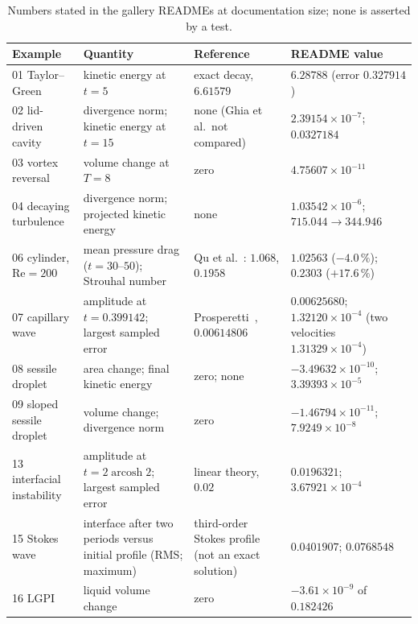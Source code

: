 \begin{table}[tbp]
  \centering\footnotesize
  \caption{Numbers stated in the gallery READMEs at documentation size; none
  is asserted by a test.}\label{tab:verif:gallery}
  \begin{tabular}{@{}>{\raggedright}p{2.2cm}>{\raggedright}p{3.4cm}>{\raggedright}p{2.5cm}>{\raggedright\arraybackslash}p{3.6cm}@{}}
    \toprule
    Example & Quantity & Reference & README value\\
    \midrule
    01 Taylor--Green & kinetic energy at $t=5$ & exact decay, $6.61579$ & $6.28788$ (error $0.327914$)\\
    02 lid-driven cavity & divergence norm; kinetic energy at $t=15$ & none (Ghia et al.\ not compared) & $2.39154\times10^{-7}$; $0.0327184$\\
    03 vortex reversal & volume change at $T=8$ & zero & $4.75607\times10^{-11}$\\
    04 decaying turbulence & divergence norm; projected kinetic energy & none & $1.03542\times10^{-6}$; $715.044\to344.946$\\
    06 cylinder, $\mathrm{Re}=200$ & mean pressure drag ($t=30$--$50$); Strouhal number & Qu et al.~\cite{qu2013}: $1.068$, $0.1958$ & $1.02563$ ($-4.0\,\%$); $0.2303$ ($+17.6\,\%$)\\
    07 capillary wave & amplitude at $t=0.399142$; largest sampled error & Prosperetti~\cite{prosperetti1981}, $0.00614806$ & $0.00625680$; $1.32120\times10^{-4}$ (two velocities $1.31329\times10^{-4}$)\\
    08 sessile droplet & area change; final kinetic energy & zero; none & $-3.49632\times10^{-10}$; $3.39393\times10^{-5}$\\
    09 sloped sessile droplet & volume change; divergence norm & zero & $-1.46794\times10^{-11}$; $7.9249\times10^{-8}$\\
    13 interfacial instability & amplitude at $t=2\operatorname{arcosh}2$; largest sampled error & linear theory, $0.02$ & $0.0196321$; $3.67921\times10^{-4}$\\
    15 Stokes wave & interface after two periods versus initial profile (RMS; maximum) & third-order Stokes profile (not an exact solution) & $0.0401907$; $0.0768548$\\
    16 LGPI & liquid volume change & zero & $-3.61\times10^{-9}$ of $0.182426$\\
    \bottomrule
  \end{tabular}
\end{table}

